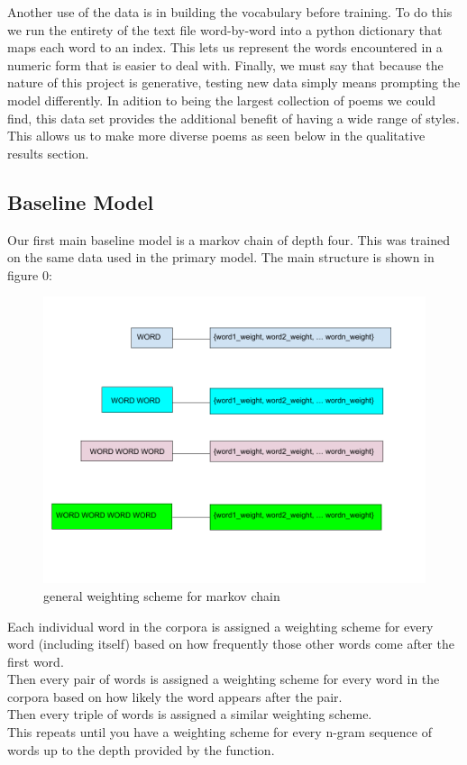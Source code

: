 \documentclass{article} %
\begin{document}
Another use of the data is in building the vocabulary before training.
To do this we run the entirety of the text file word-by-word into a python dictionary that maps each word to an index.
This lets us represent the words encountered in a numeric form that is easier to deal with.
Finally, we must say that because the nature of this project is generative,
testing new data simply means prompting the model differently.
In adition to being the largest collection of poems we could find,
this data set provides the additional benefit of having a wide range of styles.
This allows us to make more diverse poems as seen below in the qualitative results section.

\subsection{Baseline Model}

Our first main baseline model is a markov chain of depth four. This was trained on the same data used in the primary model.
The main structure is shown in figure 0:

\begin{figure}[h]
  \begin{center}
  \includegraphics[width=1\textwidth]{Figs/MARKOV.png}
  \end{center}
  \caption{general weighting scheme for markov chain}
  \label{fig:plot}
  \end{figure}

Each individual word in the corpora is assigned a weighting scheme for every word (including itself) based on how frequently those other words come
after the first word.\\
Then every pair of words is assigned a weighting scheme for every word in the corpora based on how likely the word appears after the pair.\\
Then every triple of words is assigned a similar weighting scheme.\\
This repeats until you have a weighting scheme for every n-gram sequence of words up to the depth provided by the function.\\
\end{document}

